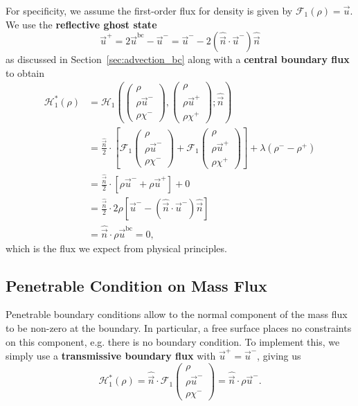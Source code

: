 \documentclass{report}
\numberwithin{equation}{section}
\begin{document}
For specificity, we assume the first-order flux for density is given by $\mathcal{F}_1(\rho) = \vec u$. 
We use the \textbf{reflective ghost state}
\begin{equation}
    \vec u^+ = 2 \vec u^{\text{bc}} - \vec u^- = \vec u^- - 2 \left(\hat{\vec n } \cdot \vec u^-\right) \hat{\vec n }
\end{equation}
as discussed in Section~\ref{sec:advection_bc} along with a \textbf{central boundary flux} to obtain
\begin{align}
    \mathcal{H}_1^*(\rho) & = \mathcal{H}_1\left(
        \begin{pmatrix} \rho \\ \rho \vec u^- \\ \rho \chi^- \end{pmatrix},
        \begin{pmatrix} \rho \\ \rho \vec u^+ \\ \rho \chi^+ \end{pmatrix}; 
    \hat{\vec n } \right) \nonumber \\
    & = \frac{\hat{\vec n }}{2} \cdot \left[
        \mathcal{F}_1\begin{pmatrix} \rho \\ \rho \vec u^- \\ \rho \chi^- \end{pmatrix} 
        + \mathcal{F}_1\begin{pmatrix} \rho \\ \rho \vec u^+ \\ \rho \chi^+ \end{pmatrix} 
    \right] + \lambda (\rho^- - \rho^+) \nonumber \\
    & = \frac{\hat{\vec n }}{2} \cdot \left[\rho \vec u^- + \rho \vec u^+ \right] + 0 \\
    & = \frac{\hat{\vec n }}{2} \cdot 2 \rho \left[\vec u^- - \left(\hat{\vec n } \cdot \vec u^-\right) \hat{\vec n } \right ] \nonumber \\
    & = \hat{\vec n } \cdot \rho \vec u^{\text{bc}} = 0 \nonumber,
\end{align}
which is the flux we expect from physical principles.

\subsection{Penetrable Condition on Mass Flux}

Penetrable boundary conditions allow to the normal component of the mass flux to be non-zero at the boundary. In particular, a free surface places no constraints on this component, e.g. there is no boundary condition. To implement this, we simply use a \textbf{transmissive boundary flux} with $\vec u^+ = \vec u^-$, giving us
\begin{equation}
    \mathcal{H}_1^*(\rho) = \hat{\vec n } \cdot \mathcal{F}_1\begin{pmatrix} \rho \\ \rho \vec u^- \\ \rho \chi^- \end{pmatrix} = \hat{\vec n } \cdot \rho \vec u^-.
\end{equation}
\end{document}

